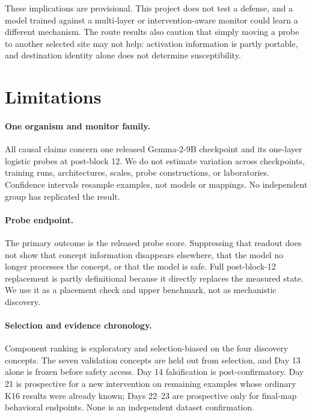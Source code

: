\documentclass[10pt]{article}
\begin{document}
These implications are provisional. This project does not test a defense, and a model trained against a multi-layer or intervention-aware monitor could learn a different mechanism. The route results also caution that simply moving a probe to another selected site may not help: activation information is partly portable, and destination identity alone does not determine susceptibility.

\section{Limitations}
\label{sec:limitations}

\paragraph{One organism and monitor family.}
All causal claims concern one released Gemma-2-9B checkpoint and its one-layer logistic probes at post-block 12. We do not estimate variation across checkpoints, training runs, architectures, scales, probe constructions, or laboratories. Confidence intervals resample examples, not models or mappings. No independent group has replicated the result.

\paragraph{Probe endpoint.}
The primary outcome is the released probe score. Suppressing that readout does not show that concept information disappears elsewhere, that the model no longer processes the concept, or that the model is safe. Full post-block-12 replacement is partly definitional because it directly replaces the measured state. We use it as a placement check and upper benchmark, not as mechanistic discovery.

\paragraph{Selection and evidence chronology.}
Component ranking is exploratory and selection-biased on the four discovery concepts. The seven validation concepts are held out from selection, and Day 13 alone is frozen before safety access. Day 14 falsification is post-confirmatory. Day 21 is prospective for a new intervention on remaining examples whose ordinary K16 results were already known; Days 22--23 are prospective only for final-map behavioral endpoints. None is an independent dataset confirmation.
\end{document}
